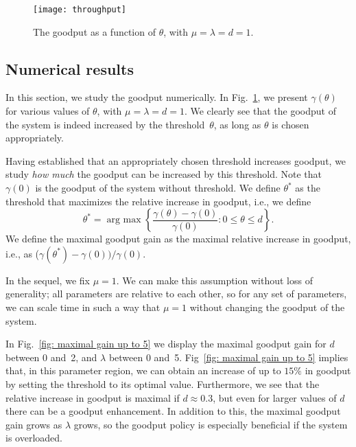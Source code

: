 \documentclass[preprint,12pt]{elsarticle}
\theoremstyle{definition}
\theoremstyle{plain}
\theoremstyle{remark}
\newcommand{\argmax}{\mathop{\mathrm{arg~max}}}
\begin{document}
\begin{figure}[t]
\centering
\texttt{[image: throughput]}
\caption{The goodput as a function of $\theta$, with $\mu = \lambda = d = 1$.}
\label{fig: throughput mu=lambda=d=1}
\end{figure}

\subsection{Numerical results} \label{section:numerical-results-threshold}

In this section, we study the goodput numerically. In Fig.~\ref{fig: throughput mu=lambda=d=1}, we present $\gamma(\theta)$ for various values of $\theta$, with $\mu = \lambda = d = 1$. We clearly see that the goodput of the system is indeed increased by the threshold~$\theta$, as long as $\theta$ is chosen appropriately.

Having established that an appropriately chosen threshold increases goodput, we study \emph{how much} the goodput can be increased by this threshold. Note that $\gamma(0)$ is the goodput of the system without threshold. We define $\theta^*$ as the threshold that maximizes the relative increase in goodput, i.e., we define
\begin{equation*}
   \theta^* = \argmax\left\{\frac{\gamma(\theta)-\gamma(0)}{\gamma(0)} : 0\leq \theta \leq d\right\}.
\end{equation*}
We define the maximal goodput gain as the maximal relative increase in goodput, i.e., as ($\gamma(\theta^*)-\gamma(0))/\gamma(0)$.

In the sequel, we fix $\mu=1$. We can make this assumption without loss of generality; all parameters are relative to each other, so for any set of parameters, we can scale time in such a way that $\mu=1$ without changing the goodput of the system.

In Fig.~\ref{fig: maximal gain up to 5} we display the maximal goodput gain for $d$ between 0 and~2, and $\lambda$ between 0 and~5. Fig~\ref{fig: maximal gain up to 5} implies that, in this parameter region, we can obtain an increase of up to $15\%$ in goodput by setting the threshold to its optimal value. Furthermore, we see that the relative increase in goodput is maximal if $d \approx 0.3$, but even for larger values of $d$ there can be a goodput enhancement. In addition to this, the maximal goodput gain grows as $\lambda$ grows, so the goodput policy is especially beneficial if the system is overloaded.
\end{document}
